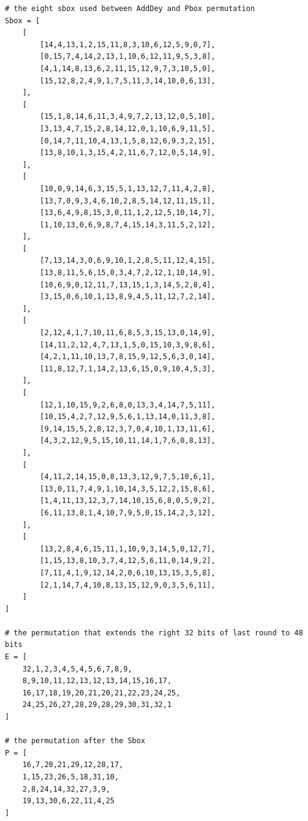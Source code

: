 \documentclass[10pt,a4paper]{article}
\begin{document}
\begin{verbatim}
# the eight sbox used between AddDey and Pbox permutation
Sbox = [
    [
        [14,4,13,1,2,15,11,8,3,10,6,12,5,9,0,7],
        [0,15,7,4,14,2,13,1,10,6,12,11,9,5,3,8],
        [4,1,14,8,13,6,2,11,15,12,9,7,3,10,5,0],
        [15,12,8,2,4,9,1,7,5,11,3,14,10,0,6,13],
    ],
    [
        [15,1,8,14,6,11,3,4,9,7,2,13,12,0,5,10],
        [3,13,4,7,15,2,8,14,12,0,1,10,6,9,11,5],
        [0,14,7,11,10,4,13,1,5,8,12,6,9,3,2,15],
        [13,8,10,1,3,15,4,2,11,6,7,12,0,5,14,9],
    ],
    [
        [10,0,9,14,6,3,15,5,1,13,12,7,11,4,2,8],
        [13,7,0,9,3,4,6,10,2,8,5,14,12,11,15,1],
        [13,6,4,9,8,15,3,0,11,1,2,12,5,10,14,7],
        [1,10,13,0,6,9,8,7,4,15,14,3,11,5,2,12],
    ],
    [
        [7,13,14,3,0,6,9,10,1,2,8,5,11,12,4,15],
        [13,8,11,5,6,15,0,3,4,7,2,12,1,10,14,9],
        [10,6,9,0,12,11,7,13,15,1,3,14,5,2,8,4],
        [3,15,0,6,10,1,13,8,9,4,5,11,12,7,2,14],
    ],
    [
        [2,12,4,1,7,10,11,6,8,5,3,15,13,0,14,9],
        [14,11,2,12,4,7,13,1,5,0,15,10,3,9,8,6],
        [4,2,1,11,10,13,7,8,15,9,12,5,6,3,0,14],
        [11,8,12,7,1,14,2,13,6,15,0,9,10,4,5,3],
    ],
    [
        [12,1,10,15,9,2,6,8,0,13,3,4,14,7,5,11],
        [10,15,4,2,7,12,9,5,6,1,13,14,0,11,3,8],
        [9,14,15,5,2,8,12,3,7,0,4,10,1,13,11,6],
        [4,3,2,12,9,5,15,10,11,14,1,7,6,0,8,13],
    ],
    [
        [4,11,2,14,15,0,8,13,3,12,9,7,5,10,6,1],
        [13,0,11,7,4,9,1,10,14,3,5,12,2,15,8,6],
        [1,4,11,13,12,3,7,14,10,15,6,8,0,5,9,2],
        [6,11,13,8,1,4,10,7,9,5,0,15,14,2,3,12],
    ],
    [
        [13,2,8,4,6,15,11,1,10,9,3,14,5,0,12,7],
        [1,15,13,8,10,3,7,4,12,5,6,11,0,14,9,2],
        [7,11,4,1,9,12,14,2,0,6,10,13,15,3,5,8],
        [2,1,14,7,4,10,8,13,15,12,9,0,3,5,6,11],
    ]
]

# the permutation that extends the right 32 bits of last round to 48 bits
E = [
    32,1,2,3,4,5,4,5,6,7,8,9,
    8,9,10,11,12,13,12,13,14,15,16,17,
    16,17,18,19,20,21,20,21,22,23,24,25,
    24,25,26,27,28,29,28,29,30,31,32,1
]

# the permutation after the Sbox
P = [
    16,7,20,21,29,12,28,17,
    1,15,23,26,5,18,31,10,
    2,8,24,14,32,27,3,9,
    19,13,30,6,22,11,4,25
]

\end{verbatim}
\end{document}
